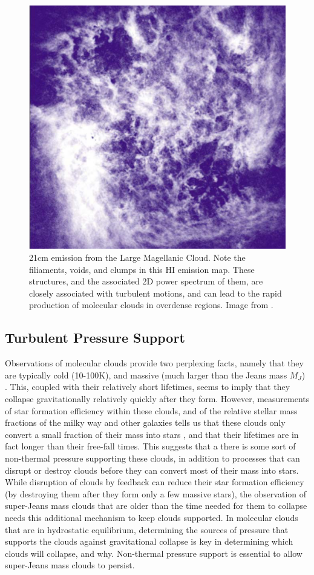 \documentclass[12pt, preprint]{aastex}
\begin{document}
\begin{figure}[H]
	\centering
	\includegraphics[scale=0.4]{figures/turbulent_LMC_elm2004.eps}
	\caption{21cm emission from the Large Magellanic Cloud.  Note the
		filiaments, voids, and clumps in this HI emission map.  These
		structures, and the associated 2D power spectrum of them, are closely
		associated with turbulent motions, and can lead to the rapid production
	of molecular clouds in overdense regions.  Image from \citet{elm2004}.}
\end{figure}
\subsection{Turbulent Pressure Support}
Observations of molecular clouds provide two perplexing facts, namely that they
are typically cold (10-100K), and massive (much larger than the Jeans mass
$M_J$) \citep{gold1978}.  This, coupled with their relatively short lifetimes,
seems to imply that they collapse gravitationally relatively quickly after they 
form.  However, measurements of star formation efficiency within these clouds,
and of the relative stellar mass fractions of the milky way and other galaxies
tells us that these clouds only convert a small fraction of their mass into
stars \citep{mac2004}, and that their lifetimes are in fact longer than their
free-fall times. This suggests that
a there is some sort of non-thermal pressure supporting these clouds, in
addition to processes that can disrupt or destroy clouds before they can convert
most of their mass into stars. While disruption of clouds by feedback can reduce
their star formation efficiency (by destroying them after they form only a few
massive stars)\citep{hopk2011}, the observation of super-Jeans mass clouds that
are older than the time needed for them to collapse needs this additional
mechanism to keep clouds supported.
In molecular clouds that are in hydrostatic equilibrium, determining the sources
of pressure that supports the clouds against gravitational collapse is key in
determining which clouds will collapse, and why.  Non-thermal pressure support is
essential to allow super-Jeans mass clouds to persist.
\end{document}
